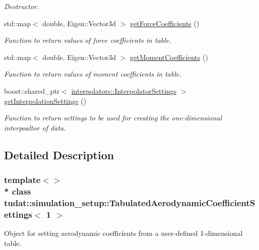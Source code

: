 \begin{DoxyCompactItemize}
\begin{DoxyCompactList}\small\item\em Destructor. \end{DoxyCompactList}\item 
std\+::map$<$ double, Eigen\+::\+Vector3d $>$ \hyperlink{classtudat_1_1simulation__setup_1_1TabulatedAerodynamicCoefficientSettings_3_011_01_4_ac042527a0371eb111e78d6544d2ae10e}{get\+Force\+Coefficients} ()
\begin{DoxyCompactList}\small\item\em Function to return values of force coefficients in table. \end{DoxyCompactList}\item 
std\+::map$<$ double, Eigen\+::\+Vector3d $>$ \hyperlink{classtudat_1_1simulation__setup_1_1TabulatedAerodynamicCoefficientSettings_3_011_01_4_a1e205b5946695335e844dc848a14a82a}{get\+Moment\+Coefficients} ()
\begin{DoxyCompactList}\small\item\em Function to return values of moment coefficients in table. \end{DoxyCompactList}\item 
boost\+::shared\+\_\+ptr$<$ \hyperlink{classtudat_1_1interpolators_1_1InterpolatorSettings}{interpolators\+::\+Interpolator\+Settings} $>$ \hyperlink{classtudat_1_1simulation__setup_1_1TabulatedAerodynamicCoefficientSettings_3_011_01_4_a979d21b8338faa8564ccc1de34f7c40e}{get\+Interpolation\+Settings} ()
\begin{DoxyCompactList}\small\item\em Function to return settings to be used for creating the one-\/dimensional interpoaltor of data. \end{DoxyCompactList}\end{DoxyCompactItemize}


\subsection{Detailed Description}
\subsubsection*{template$<$$>$\\*
class tudat\+::simulation\+\_\+setup\+::\+Tabulated\+Aerodynamic\+Coefficient\+Settings$<$ 1 $>$}

Object for setting aerodynamic coefficients from a user-\/defined 1-\/dimensional table. 

